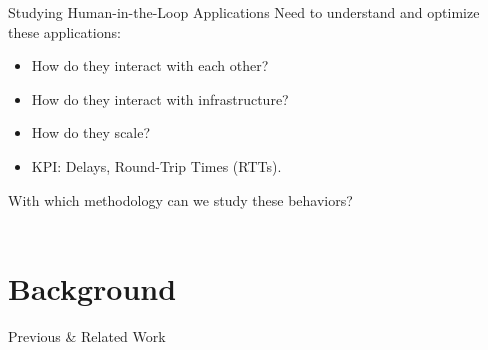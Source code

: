 \documentclass[aspectratio=1610]{beamer}
\begin{document}
\begin{frame}{Studying Human-in-the-Loop Applications}
    Need to understand and optimize these applications:%
    \begin{itemize}
        \item How do they interact with each other?
        \item How do they interact with infrastructure?
        \item How do they scale?
        \item KPI: Delays, Round-Trip Times (RTTs).
    \end{itemize}%
    \vspace{1em}%
    \begin{center}
        {\Large With which methodology can we study these behaviors?}\\
        \vspace{2em}%
        \\
        \Large\bfseries\color{red}
    \end{center}
\end{frame}

\section{Background}
\begin{frame}{Previous \& Related Work}
    \begin{center}
        \\
    \end{center}
\end{frame}
\end{document}
